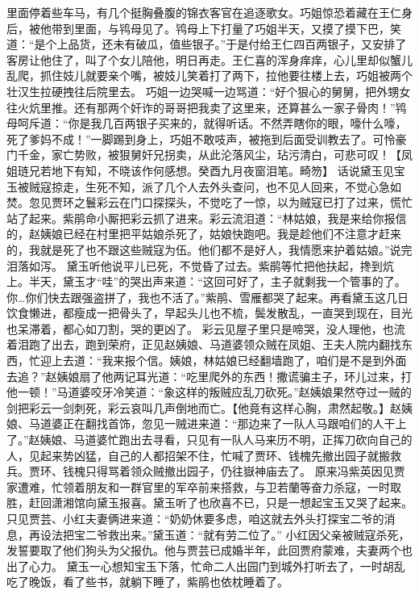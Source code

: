 \documentclass[12pt,oneside]{book}
\begin{document}
里面停着些车马，有几个挺胸叠腹的锦衣客官在追逐歌女。巧姐惊恐着藏在王仁身后，被他带到里面，与鸨母见了。鸨母上下打量了巧姐半天，又摸了摸下巴，笑道：“是个上品货，还未有破瓜，值些银子。”于是付给王仁四百两银子，又安排了客房让他住了，叫了个女儿陪他，明日再走。王仁喜的浑身痒痒，心儿里却似蟹儿乱爬，抓住妓儿就要亲个嘴，被妓儿笑着打了两下，拉他要往楼上去，巧姐被两个壮汉生拉硬拽往后院里去。
巧姐一边哭喊一边骂道：“好个狠心的舅舅，把外甥女往火炕里推。还有那两个奸诈的哥哥把我卖了这里来，还算甚么一家子骨肉！”鸨母呵斥道：“你是我几百两银子买来的，就得听话。不然弄瞎你的眼，嚎什么嚎，死了爹妈不成！”一脚踢到身上，巧姐不敢吱声，被拖到后面受训教去了。可怜豪门千金，家亡势败，被狠舅奸兄拐卖，从此沦落风尘，玷污清白，可悲可叹！【凤姐琏兄若地下有知，不晓该作何感想。癸酉九月夜窗泪笔。畸笏】
话说黛玉见宝玉被贼寇掠走，生死不知，派了几个人去外头查问，也不见人回来，不觉心急如焚。忽见贾环之鬟彩云在门口探探头，不觉吃了一惊，以为贼寇已打了过来，慌忙站了起来。紫鹃命小厮把彩云抓了进来。彩云流泪道：“林姑娘，我是来给你报信的，赵姨娘已经在村里把平姑娘杀死了，姑娘快跑吧。我是趁他们不注意才赶来的，我就是死了也不跟这些贼寇为伍。他们都不是好人，我情愿来护着姑娘。”说完泪落如泻。
黛玉听他说平儿已死，不觉昏了过去。紫鹃等忙把他扶起，搀到炕上。半天，黛玉才“哇”的哭出声来道：“这回可好了，主子就剩我一个管事的了。你…你们快去跟强盗拼了，我也不活了。”紫鹃、雪雁都哭了起来。再看黛玉这几日饮食懒进，都瘦成一把骨头了，早起头儿也不梳，鬓发散乱，一直哭到现在，目光也呆滞着，都心如刀割，哭的更凶了。
彩云见屋子里只是啼哭，没人理他，也流着泪跑了出去，跑到荣府，正见赵姨娘、马道婆领众贼在凤姐、王夫人院内翻找东西，忙迎上去道：“我来报个信。姨娘，林姑娘已经翻墙跑了，咱们是不是到外面去追？”赵姨娘扇了他两记耳光道：“吃里爬外的东西！撒谎骗主子，环儿过来，打他一顿！”马道婆咬牙冷笑道：“象这样的叛贼应乱刀砍死。”赵姨娘果然夺过一贼的剑把彩云一剑刺死，彩云哀叫几声倒地而亡。【他竟有这样心胸，肃然起敬。】赵姨娘、马道婆正在翻找首饰，忽见一贼进来道：“那边来了一队人马跟咱们的人干上了。”赵姨娘、马道婆忙跑出去寻看，只见有一队人马来历不明，正挥刀砍向自己的人，见起来势凶猛，自己的人都招架不住，忙喊了贾环、钱槐先撤出园子就搬救兵。贾环、钱槐只得骂着领众贼撤出园子，仍往嶽神庙去了。
原来冯紫英因见贾家遭难，忙领着朋友和一群官里的军卒前来搭救，与卫若蘭等奋力杀寇，一时取胜，赶回潇湘馆向黛玉报喜。黛玉听了也欣喜不已，只是一想起宝玉又哭了起来。只见贾芸、小红夫妻俩进来道：“奶奶休要多虑，咱这就去外头打探宝二爷的消息，再设法把宝二爷救出来。”黛玉道：“就有劳二位了。”
小红因父亲被贼寇杀死，发誓要取了他们狗头为父报仇。他与贾芸已成婚半年，此回贾府蒙难，夫妻两个也出了心力。
黛玉一心想知宝玉下落，忙命二人出园门到城外打听去了，一时胡乱吃了晚饭，看了些书，就躺下睡了，紫鹃也依枕睡着了。
\end{document}
